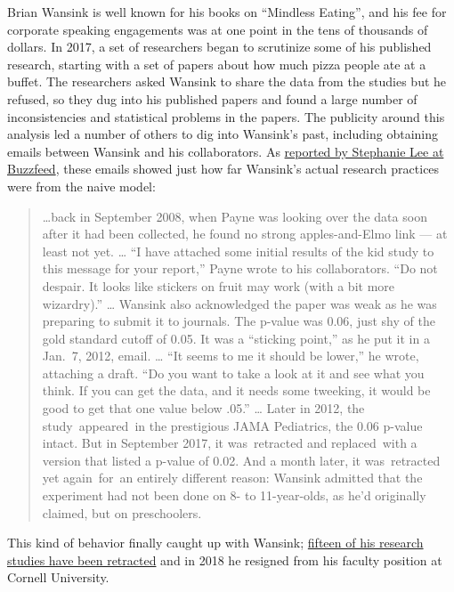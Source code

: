 \documentclass[
  12pt,
]{book}
\begin{document}
Brian Wansink is well known for his books on ``Mindless Eating'', and his fee for corporate speaking engagements was at one point in the tens of thousands of dollars. In 2017, a set of researchers began to scrutinize some of his published research, starting with a set of papers about how much pizza people ate at a buffet. The researchers asked Wansink to share the data from the studies but he refused, so they dug into his published papers and found a large number of inconsistencies and statistical problems in the papers. The publicity around this analysis led a number of others to dig into Wansink's past, including obtaining emails between Wansink and his collaborators. As \href{https://www.buzzfeednews.com/article/stephaniemlee/brian-wansink-cornell-p-hacking}{reported by Stephanie Lee at Buzzfeed}, these emails showed just how far Wansink's actual research practices were from the naive model:

\begin{quote}
\ldots back in September 2008, when Payne was looking over the data soon after it had been collected, he found no strong apples-and-Elmo link --- at least not yet. \ldots{}
``I have attached some initial results of the kid study to this message for your report,'' Payne wrote to his collaborators. ``Do not despair. It looks like stickers on fruit may work (with a bit more wizardry).'' \ldots{}
Wansink also acknowledged the paper was weak as he was preparing to submit it to journals. The p-value was 0.06, just shy of the gold standard cutoff of 0.05. It was a ``sticking point,'' as he put it in a Jan.~7, 2012, email. \ldots{}
``It seems to me it should be lower,'' he wrote, attaching a draft. ``Do you want to take a look at it and see what you think. If you can get the data, and it needs some tweeking, it would be good to get that one value below .05.'' \ldots{}
Later in 2012, the study~appeared~in the prestigious JAMA Pediatrics, the 0.06 p-value intact. But in September 2017, it was~retracted and replaced~with a version that listed a p-value of 0.02. And a month later, it was~retracted yet again~for~an entirely different reason: Wansink admitted that the experiment had not been done on 8- to 11-year-olds, as he'd originally claimed, but on preschoolers.
\end{quote}

This kind of behavior finally caught up with Wansink; \href{https://www.vox.com/science-and-health/2018/9/19/17879102/brian-wansink-cornell-food-brand-lab-retractions-jama}{fifteen of his research studies have been retracted} and in 2018 he resigned from his faculty position at Cornell University.
\end{document}
